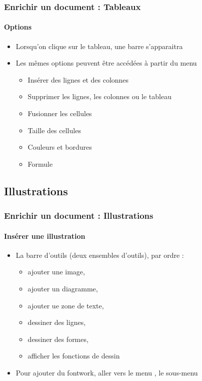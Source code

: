 \documentclass[xcolor=table]{beamer}
\begin{document}
\begin{frame}[t]
\frametitle{Enrichir un document : Tableaux}
\framesubtitle{Options}


\begin{itemize}
	\item Lorsqu'on clique sur le tableau, une barre s'apparaitra
	\item Les mêmes options peuvent être accédées à partir du menu 
	\begin{itemize}
		\item Insérer des lignes et des colonnes
		\item Supprimer les lignes, les colonnes ou le tableau
		\item Fusionner les cellules
		\item Taille des cellules
		\item Couleurs et bordures
		\item Formule
	\end{itemize}
\end{itemize}

\end{frame}

\subsection{Illustrations}

\begin{frame}[t]
\frametitle{Enrichir un document : Illustrations}
\framesubtitle{Insérer une illustration}

\begin{minipage}{0.64\textwidth}
	\begin{itemize}
		\item La barre d'outils (deux ensembles d'outils), par ordre : 
		\begin{itemize}
			\item ajouter une image,
			\item ajouter un diagramme,
			\item ajouter ue zone de texte,
			\item dessiner des lignes,
			\item dessiner des formes,
			\item afficher les fonctions de dessin 
		\end{itemize}
		\item Pour ajouter du fontwork, aller vers le menu , le sous-menu 
	\end{itemize}
\end{minipage}
\begin{minipage}{0.35\textwidth}
	
\end{minipage}


\end{frame}
\end{document}
